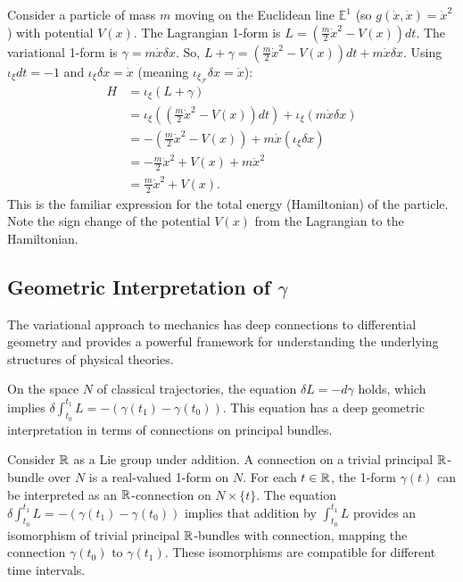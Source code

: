 \begin{example}
\label{ex:particle_E1_hamiltonian}
Consider a particle of mass $m$ moving on the Euclidean line $\mathbb{E}^1$ (so $g(\dot{x},\dot{x}) = \dot{x}^2$) with potential $V(x)$.
The Lagrangian 1-form is $L = \left(\frac{m}{2}\dot{x}^2 - V(x)\right)dt$.
The variational 1-form is $\gamma = m\dot{x}\delta x$.
So, $L+\gamma = \left(\frac{m}{2}\dot{x}^2 - V(x)\right)dt + m\dot{x}\delta x$.
Using $\iota_{\xi}dt = -1$ and $\iota_{\xi}\delta x = \dot{x}$ (meaning $\iota_{\xi_{\mathcal{F}}}\delta x = \dot{x}$):
\begin{align*}
    H &= \iota_{\xi}(L+\gamma) \\
      &= \iota_{\xi}\left(\left(\frac{m}{2}\dot{x}^2 - V(x)\right)dt\right) + \iota_{\xi}(m\dot{x}\delta x) \\
      &= -\left(\frac{m}{2}\dot{x}^2 - V(x)\right) + m\dot{x}(\iota_{\xi}\delta x) \\
      &= -\frac{m}{2}\dot{x}^2 + V(x) + m\dot{x}^2 \\
      &= \frac{m}{2}\dot{x}^2 + V(x).
\end{align*}
This is the familiar expression for the total energy (Hamiltonian) of the particle. Note the sign change of the potential $V(x)$ from the Lagrangian to the Hamiltonian.
\end{example}

\subsection{Geometric Interpretation of $\gamma$}

The variational approach to mechanics has deep connections to differential geometry and provides a powerful framework for understanding the underlying structures of physical theories.

On the space $N$ of classical trajectories, the equation $\delta L = -d\gamma$ holds, which implies $\delta \int_{t_0}^{t_1} L = -(\gamma(t_1) - \gamma(t_0))$. This equation has a deep geometric interpretation in terms of connections on principal bundles.

Consider $\mathbb{R}$ as a Lie group under addition. A connection on a trivial principal $\mathbb{R}$-bundle over $N$ is a real-valued 1-form on $N$. For each $t \in \mathbb{R}$, the 1-form $\gamma(t)$ can be interpreted as an $\mathbb{R}$-connection on $N \times \{t\}$. The equation $\delta \int_{t_0}^{t_1} L = -(\gamma(t_1) - \gamma(t_0))$ implies that addition by $\int_{t_0}^{t_1} L$ provides an isomorphism of trivial principal $\mathbb{R}$-bundles with connection, mapping the connection $\gamma(t_0)$ to $\gamma(t_1)$. These isomorphisms are compatible for different time intervals.

